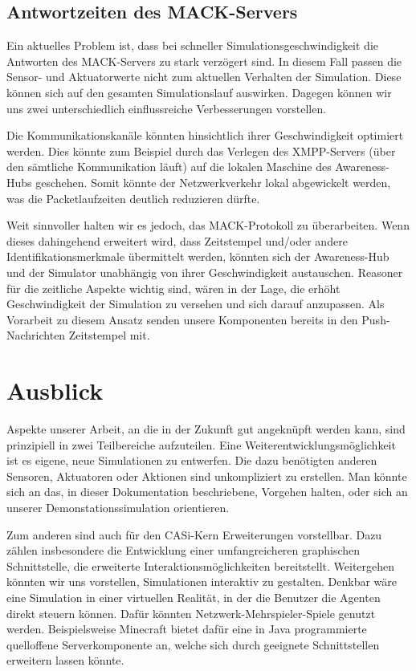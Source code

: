 \subsection{Antwortzeiten des MACK-Servers}\label{subsec:conc_open_questions_mack}
Ein aktuelles Problem ist, dass bei schneller Simulationsgeschwindigkeit die Antworten des MACK-Servers zu stark verzögert sind. In diesem Fall passen die Sensor- und Aktuatorwerte nicht zum aktuellen Verhalten der Simulation. Diese können sich auf den gesamten Simulationslauf auswirken. Dagegen können wir uns zwei unterschiedlich einflussreiche Verbesserungen vorstellen. 

Die Kommunikationskanäle könnten hinsichtlich ihrer Geschwindigkeit optimiert werden. Dies könnte zum Beispiel durch das Verlegen des XMPP-Servers (über den sämtliche Kommunikation läuft) auf die lokalen Maschine des Awareness-Hubs geschehen. Somit könnte der Netzwerkverkehr lokal abgewickelt werden, was die Packetlaufzeiten deutlich reduzieren dürfte.

Weit sinnvoller halten wir es jedoch, das MACK-Protokoll zu überarbeiten. Wenn dieses dahingehend erweitert wird, dass Zeitstempel und/oder andere Identifikationsmerkmale übermittelt werden, könnten sich der Awareness-Hub und der Simulator unabhängig von ihrer Geschwindigkeit austauschen. Reasoner für die zeitliche Aspekte wichtig sind, wären in der Lage, die erhöht Geschwindigkeit der Simulation zu versehen und sich darauf anzupassen. Als Vorarbeit zu diesem Ansatz senden unsere Komponenten bereits in den Push-Nachrichten Zeitstempel mit.

\section{Ausblick}\label{sec:conc_outlook}
Aspekte unserer Arbeit, an die in der Zukunft gut angeknüpft werden kann, sind prinzipiell in zwei Teilbereiche aufzuteilen. Eine Weiterentwicklungsmöglichkeit ist es eigene, neue Simulationen zu entwerfen. Die dazu benötigten anderen Sensoren, Aktuatoren oder Aktionen sind unkompliziert zu erstellen. Man könnte sich an das, in dieser Dokumentation beschriebene, Vorgehen halten, oder sich an unserer Demonstations\-simulation orientieren.

Zum anderen sind auch für den CASi-Kern Erweiterungen vorstellbar. Dazu zählen insbesondere die Entwicklung einer umfangreicheren graphischen Schnittstelle, die erweiterte Interaktionsmöglichkeiten bereitstellt. Weitergehen könnten wir uns vorstellen, Simulationen interaktiv zu gestalten. Denkbar wäre  eine Simulation in einer virtuellen Realität, in der die Benutzer die Agenten direkt steuern können. Dafür könnten Netzwerk-Mehrspieler-Spiele genutzt werden. Beispielsweise Minecraft \cite{web-minecraft} bietet dafür eine in Java programmierte quelloffene Serverkomponente an, welche sich durch geeignete Schnittstellen erweitern lassen könnte.
